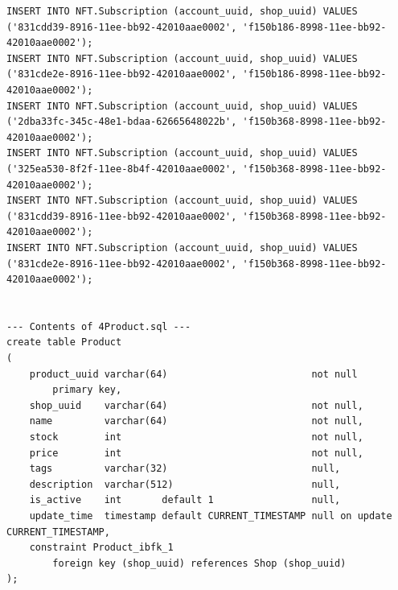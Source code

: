 \documentclass[a4paper, 12pt]{article}
\begin{document}
\begin{lstlisting}
INSERT INTO NFT.Subscription (account_uuid, shop_uuid) VALUES ('831cdd39-8916-11ee-bb92-42010aae0002', 'f150b186-8998-11ee-bb92-42010aae0002');
INSERT INTO NFT.Subscription (account_uuid, shop_uuid) VALUES ('831cde2e-8916-11ee-bb92-42010aae0002', 'f150b186-8998-11ee-bb92-42010aae0002');
INSERT INTO NFT.Subscription (account_uuid, shop_uuid) VALUES ('2dba33fc-345c-48e1-bdaa-62665648022b', 'f150b368-8998-11ee-bb92-42010aae0002');
INSERT INTO NFT.Subscription (account_uuid, shop_uuid) VALUES ('325ea530-8f2f-11ee-8b4f-42010aae0002', 'f150b368-8998-11ee-bb92-42010aae0002');
INSERT INTO NFT.Subscription (account_uuid, shop_uuid) VALUES ('831cdd39-8916-11ee-bb92-42010aae0002', 'f150b368-8998-11ee-bb92-42010aae0002');
INSERT INTO NFT.Subscription (account_uuid, shop_uuid) VALUES ('831cde2e-8916-11ee-bb92-42010aae0002', 'f150b368-8998-11ee-bb92-42010aae0002');


--- Contents of 4Product.sql ---
create table Product
(
    product_uuid varchar(64)                         not null
        primary key,
    shop_uuid    varchar(64)                         not null,
    name         varchar(64)                         not null,
    stock        int                                 not null,
    price        int                                 not null,
    tags         varchar(32)                         null,
    description  varchar(512)                        null,
    is_active    int       default 1                 null,
    update_time  timestamp default CURRENT_TIMESTAMP null on update CURRENT_TIMESTAMP,
    constraint Product_ibfk_1
        foreign key (shop_uuid) references Shop (shop_uuid)
);


\end{lstlisting}
\end{document}
